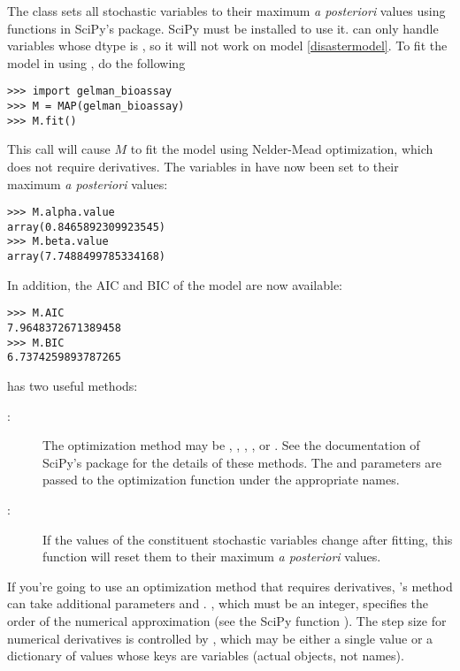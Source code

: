 The  class sets all stochastic variables to their maximum \emph{a posteriori} values using functions in SciPy's  package. SciPy must be installed to use it.  can only handle variables whose dtype is , so it will not work on model \ref{disastermodel}. To fit the model in  using , do the following
\begin{verbatim}
>>> import gelman_bioassay
>>> M = MAP(gelman_bioassay)
>>> M.fit()
\end{verbatim}
This call will cause $M$ to fit the model using Nelder-Mead optimization, which does not require derivatives. The variables in  have now been set to their maximum \emph{a posteriori} values:
\begin{verbatim}
>>> M.alpha.value
array(0.8465892309923545)
>>> M.beta.value
array(7.7488499785334168)
\end{verbatim}
In addition, the AIC and BIC of the model are now available:
\begin{verbatim}
>>> M.AIC
7.9648372671389458
>>> M.BIC
6.7374259893787265
\end{verbatim}

\bigskip
{} has two useful methods:
\begin{description}
    \item[:] The optimization method may be , , , , or . See the documentation of SciPy's  package for the details of these methods. The  and  parameters are passed to the optimization function under the appropriate names.
    \item[:] If the values of the constituent stochastic variables change after fitting, this function will reset them to their maximum \emph{a posteriori} values.
\end{description}
If you're going to use an optimization method that requires derivatives, 's  method can take additional parameters  and . , which must be an integer, specifies the order of the numerical approximation (see the SciPy function ). The step size for numerical derivatives is controlled by , which may be either a single value or a dictionary of values whose keys are variables (actual objects, not names).

